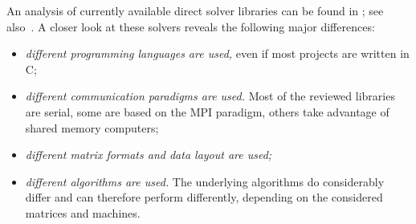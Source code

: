 \documentclass[acmtocl]{acmtrans2m}
\begin{document}
%
%

An analysis of currently available direct solver libraries can be found
in \cite{davis05summary}; see also~\cite[Section 6.7]{dongarra98numerical}.
A closer look at these solvers reveals the following major
differences:
\begin{itemize}
\item {\sl different programming languages are used,} even if most projects are
written in C;

\item {\sl different communication paradigms are used.} 
 Most of the reviewed libraries are serial, some are based on the MPI
 paradigm, others take advantage of shared memory computers;

\item {\sl different matrix formats and data layout are used;}

\item {\sl different algorithms are used.} The underlying algorithms do
considerably differ
and can therefore perform differently, depending on the considered matrices and
machines.

\end{itemize}
\end{document}

